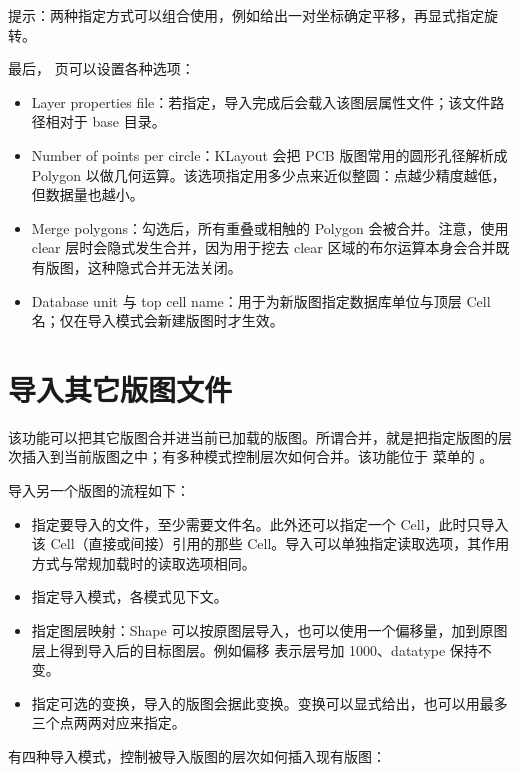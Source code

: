 提示：两种指定方式可以组合使用，例如给出一对坐标确定平移，再显式指定旋转。


最后， 页可以设置各种选项：

\begin{itemize}
\item Layer properties file：若指定，导入完成后会载入该图层属性文件；该文件路径相对于 base 目录。
\item Number of points per circle：KLayout 会把 PCB 版图常用的圆形孔径解析成 Polygon 以做几何运算。该选项指定用多少点来近似整圆：点越少精度越低，但数据量也越小。
\item Merge polygons：勾选后，所有重叠或相触的 Polygon 会被合并。注意，使用 clear 层时会隐式发生合并，因为用于挖去 clear 区域的布尔运算本身会合并既有版图，这种隐式合并无法关闭。
\item Database unit 与 top cell name：用于为新版图指定数据库单位与顶层 Cell 名；仅在导入模式会新建版图时才生效。
\end{itemize}

\section{导入其它版图文件}\label{sec:import_layout}

该功能可以把其它版图合并进当前已加载的版图。所谓合并，就是把指定版图的层次插入到当前版图之中；有多种模式控制层次如何合并。该功能位于  菜单的 。

导入另一个版图的流程如下：

\begin{itemize}
\item 指定要导入的文件，至少需要文件名。此外还可以指定一个 Cell，此时只导入该 Cell（直接或间接）引用的那些 Cell。导入可以单独指定读取选项，其作用方式与常规加载时的读取选项相同。
\item 指定导入模式，各模式见下文。
\item 指定图层映射：Shape 可以按原图层导入，也可以使用一个偏移量，加到原图层上得到导入后的目标图层。例如偏移  表示层号加 1000、datatype 保持不变。
\item 指定可选的变换，导入的版图会据此变换。变换可以显式给出，也可以用最多三个点两两对应来指定。
\end{itemize}

有四种导入模式，控制被导入版图的层次如何插入现有版图：

